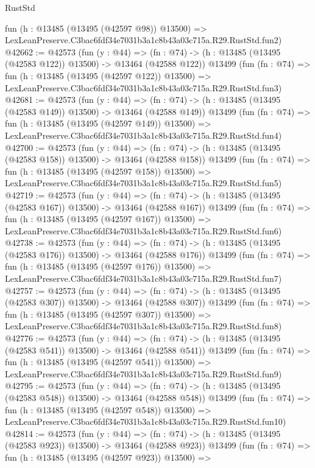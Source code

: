 \begin{lexlean}{RustStd}
\begin{coremodule}
    fun (h : @13485 (@13495 (@42597 @98)) @13500) =>
    LexLeanPreserve.C3bac6fdf34e7031b3a1c8b43a03c715a.R29.RustStd.fun2)
@42662 := @42573
    (fun (y : @44) =>
    (fn : @74) -> (h : @13485 (@13495 (@42583 @122)) @13500) -> @13464 (@42588 @122))
    @13499
    (fun (fn : @74) =>
    fun (h : @13485 (@13495 (@42597 @122)) @13500) =>
    LexLeanPreserve.C3bac6fdf34e7031b3a1c8b43a03c715a.R29.RustStd.fun3)
@42681 := @42573
    (fun (y : @44) =>
    (fn : @74) -> (h : @13485 (@13495 (@42583 @149)) @13500) -> @13464 (@42588 @149))
    @13499
    (fun (fn : @74) =>
    fun (h : @13485 (@13495 (@42597 @149)) @13500) =>
    LexLeanPreserve.C3bac6fdf34e7031b3a1c8b43a03c715a.R29.RustStd.fun4)
@42700 := @42573
    (fun (y : @44) =>
    (fn : @74) -> (h : @13485 (@13495 (@42583 @158)) @13500) -> @13464 (@42588 @158))
    @13499
    (fun (fn : @74) =>
    fun (h : @13485 (@13495 (@42597 @158)) @13500) =>
    LexLeanPreserve.C3bac6fdf34e7031b3a1c8b43a03c715a.R29.RustStd.fun5)
@42719 := @42573
    (fun (y : @44) =>
    (fn : @74) -> (h : @13485 (@13495 (@42583 @167)) @13500) -> @13464 (@42588 @167))
    @13499
    (fun (fn : @74) =>
    fun (h : @13485 (@13495 (@42597 @167)) @13500) =>
    LexLeanPreserve.C3bac6fdf34e7031b3a1c8b43a03c715a.R29.RustStd.fun6)
@42738 := @42573
    (fun (y : @44) =>
    (fn : @74) -> (h : @13485 (@13495 (@42583 @176)) @13500) -> @13464 (@42588 @176))
    @13499
    (fun (fn : @74) =>
    fun (h : @13485 (@13495 (@42597 @176)) @13500) =>
    LexLeanPreserve.C3bac6fdf34e7031b3a1c8b43a03c715a.R29.RustStd.fun7)
@42757 := @42573
    (fun (y : @44) =>
    (fn : @74) -> (h : @13485 (@13495 (@42583 @307)) @13500) -> @13464 (@42588 @307))
    @13499
    (fun (fn : @74) =>
    fun (h : @13485 (@13495 (@42597 @307)) @13500) =>
    LexLeanPreserve.C3bac6fdf34e7031b3a1c8b43a03c715a.R29.RustStd.fun8)
@42776 := @42573
    (fun (y : @44) =>
    (fn : @74) -> (h : @13485 (@13495 (@42583 @541)) @13500) -> @13464 (@42588 @541))
    @13499
    (fun (fn : @74) =>
    fun (h : @13485 (@13495 (@42597 @541)) @13500) =>
    LexLeanPreserve.C3bac6fdf34e7031b3a1c8b43a03c715a.R29.RustStd.fun9)
@42795 := @42573
    (fun (y : @44) =>
    (fn : @74) -> (h : @13485 (@13495 (@42583 @548)) @13500) -> @13464 (@42588 @548))
    @13499
    (fun (fn : @74) =>
    fun (h : @13485 (@13495 (@42597 @548)) @13500) =>
    LexLeanPreserve.C3bac6fdf34e7031b3a1c8b43a03c715a.R29.RustStd.fun10)
@42814 := @42573
    (fun (y : @44) =>
    (fn : @74) -> (h : @13485 (@13495 (@42583 @923)) @13500) -> @13464 (@42588 @923))
    @13499
    (fun (fn : @74) =>
    fun (h : @13485 (@13495 (@42597 @923)) @13500) =>

\end{coremodule}
\end{lexlean}
